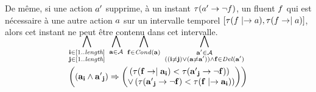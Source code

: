 De m\^{e}me, si une action $a'$ supprime, \`{a} un instant $\tau(a'\rightarrow\neg f)$, un fluent $f$ qui est n\'{e}cessaire \`{a} une autre action $a$ sur un intervalle temporel $[\tau(f\mid\rightarrow a), \tau(f\rightarrow\mid a)]$, alors cet instant ne peut \^{e}tre contenu dans cet intervalle.

\begin{small}
\begin{multline*}
~\\[-3em]
\bigwedge\limits_{\substack{\mathbf{i}\in [1..\mathbf{\length}]\\ \mathbf{j}\in [1..\mathbf{\length}]}}%
~\bigwedge\limits_{\substack{\mathbf{\a}\in \mathbf{\A}}}~\bigwedge\limits_{\substack{\mathbf{\f}\in \cond{\mathbf{\a}}}}~\bigwedge\limits_{\substack{\mathbf{\b}\in \mathbf{\A}\\((\mathbf{i} \neq \mathbf{j}) \vee (\mathbf{\a} \neq \mathbf{\b})) \wedge \mathbf{\f} \in \del{\mathbf{\b}}}}\hfill\\
\left(\left(\mathbf{\a}_{\mathbf{i}} \wedge \mathbf{\b}_{\mathbf{j}}\right) \Rightarrow \begin{pmatrix}\left(\tau(\mathbf{f}\rightarrow\mid\mathbf{\a}_\mathbf{i}) < \tau(\mathbf{\b}_\mathbf{j}\rightarrow \neg \mathbf{\f})\right)\hfill\\
 \vee \left(\tau(\mathbf{\b}_\mathbf{j}\rightarrow \neg \mathbf{\f}) < \tau(\mathbf{\f}\mid\rightarrow\mathbf{\a}_\mathbf{i})\right)\end{pmatrix}\right)\hfill\\[-2em]
\end{multline*}
\end{small}


